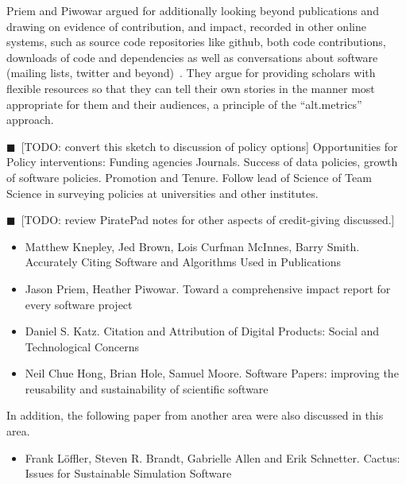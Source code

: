 \documentclass[11pt, oneside]{amsart}
\newcommand{\todo}[1]{{\color{blue}$\blacksquare$~\textsf{[TODO: #1]}}}
\begin{document}
Priem and Piwowar argued for additionally looking beyond publications and drawing on evidence of contribution, and impact, recorded in other online systems, such as source code repositories like github, both code contributions, downloads of code and dependencies as well as conversations about software (mailing lists, twitter and beyond)~\cite{Priem_WSSSPE}. They argue for providing scholars with flexible resources so that they can tell their own stories in the manner most appropriate for them and their audiences, a principle of the ``alt.metrics'' approach.

\todo{convert this sketch to discussion of policy options}
        Opportunities for Policy interventions:
                Funding agencies
                Journals.  Success of data policies, growth of software policies.
                Promotion and Tenure. Follow lead of Science of Team Science in surveying policies at universities and other institutes.

\todo{review PiratePad notes for other aspects of credit-giving discussed.}
\begin{itemize}

\item Matthew Knepley, Jed Brown, Lois Curfman McInnes, Barry
  Smith. Accurately Citing Software and Algorithms Used in
  Publications~\cite{Knepley_WSSSPE}

\item Jason Priem, Heather Piwowar. Toward a comprehensive impact
  report for every software project~\cite{Priem_WSSSPE}

\item Daniel S. Katz. Citation and Attribution of Digital Products:
  Social and Technological Concerns~\cite{Katz2_WSSSPE}

\item Neil Chue Hong, Brian Hole, Samuel Moore. Software Papers:
  improving the reusability and sustainability of scientific software~\cite{Chue_Hong_WSSSPE}

\end{itemize}

In addition, the following paper from another area were also discussed
in this area.

\begin{itemize}

\item Frank L\"{o}ffler, Steven R. Brandt, Gabrielle Allen and Erik
  Schnetter. Cactus: Issues for Sustainable Simulation Software~\cite{Loffler_WSSSPE}

\end{itemize}
\end{document}
